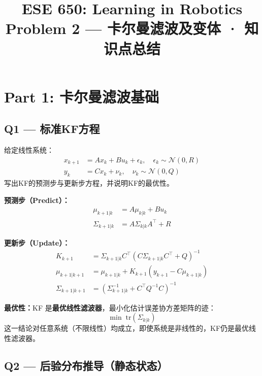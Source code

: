 \documentclass[12pt]{article}
\title{\textbf{ESE 650: Learning in Robotics}\\
\large Problem 2 --- 卡尔曼滤波及变体 · 知识点总结}
\author{}
\date{}
\begin{document}
\maketitle

\section*{Part 1: 卡尔曼滤波基础}

\subsection*{Q1 --- 标准KF方程}

\begin{tcolorbox}[questionbox]
给定线性系统：
\begin{align*}
  x_{k+1} &= A x_k + B u_k + \epsilon_k, \quad \epsilon_k \sim \mathcal{N}(0, R)\\
  y_k &= C x_k + \nu_k, \quad \nu_k \sim \mathcal{N}(0, Q)
\end{align*}
写出KF的预测步与更新步方程，并说明KF的最优性。
\end{tcolorbox}

\begin{tcolorbox}[answerbox]
\textbf{预测步（Predict）：}
\begin{align*}
  \mu_{k+1|k} &= A\mu_{k|k} + Bu_k \\
  \Sigma_{k+1|k} &= A\Sigma_{k|k}A^\top + R
\end{align*}

\textbf{更新步（Update）：}
\begin{align*}
  K_{k+1} &= \Sigma_{k+1|k} C^\top \left(C \Sigma_{k+1|k} C^\top + Q\right)^{-1} \\
  \mu_{k+1|k+1} &= \mu_{k+1|k} + K_{k+1}(y_{k+1} - C\mu_{k+1|k}) \\
  \Sigma_{k+1|k+1} &= \left(\Sigma_{k+1|k}^{-1} + C^\top Q^{-1} C\right)^{-1}
\end{align*}

\textbf{最优性：}KF 是\textbf{最优线性滤波器}，最小化估计误差协方差矩阵的迹：
\[
  \min\;\mathrm{tr}(\Sigma_{k|k})
\]
这一结论对任意系统（不限线性）均成立，即使系统是非线性的，KF仍是最优线性滤波器。
\end{tcolorbox}

\subsection*{Q2 --- 后验分布推导（静态状态）}
\end{document}
